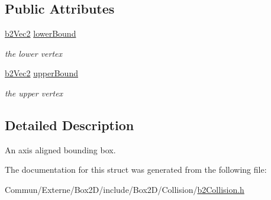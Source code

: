 \subsection*{Public Attributes}
\begin{DoxyCompactItemize}
\item 
\hyperlink{structb2_vec2}{b2\+Vec2} \hyperlink{structb2_a_a_b_b_ab94b68fbad8348b22b0522469b11bdb5}{lower\+Bound}\hypertarget{structb2_a_a_b_b_ab94b68fbad8348b22b0522469b11bdb5}{}\label{structb2_a_a_b_b_ab94b68fbad8348b22b0522469b11bdb5}

\begin{DoxyCompactList}\small\item\em the lower vertex \end{DoxyCompactList}\item 
\hyperlink{structb2_vec2}{b2\+Vec2} \hyperlink{structb2_a_a_b_b_ad4a8ec483ba13a2c02918b01d058a18f}{upper\+Bound}\hypertarget{structb2_a_a_b_b_ad4a8ec483ba13a2c02918b01d058a18f}{}\label{structb2_a_a_b_b_ad4a8ec483ba13a2c02918b01d058a18f}

\begin{DoxyCompactList}\small\item\em the upper vertex \end{DoxyCompactList}\end{DoxyCompactItemize}


\subsection{Detailed Description}
An axis aligned bounding box. 

The documentation for this struct was generated from the following file\+:\begin{DoxyCompactItemize}
\item 
Commun/\+Externe/\+Box2\+D/include/\+Box2\+D/\+Collision/\hyperlink{b2_collision_8h}{b2\+Collision.\+h}\end{DoxyCompactItemize}
